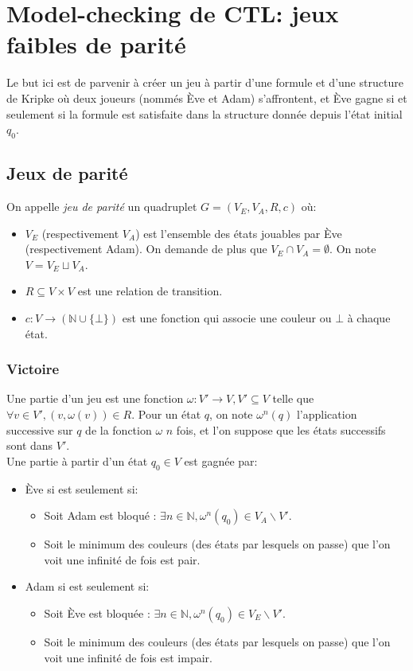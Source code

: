 \documentclass[10pt,a4paper]{article}
\begin{document}
\section{Model-checking de CTL: jeux faibles de parité}
Le but ici est de parvenir à créer un jeu à partir d'une formule et d'une structure de Kripke où deux joueurs (nommés Ève et Adam) s'affrontent, et Ève gagne si et seulement si la formule est satisfaite dans la structure donnée depuis l'état initial $q_0$.

\subsection{Jeux de parité}
On appelle \emph{jeu de parité} un quadruplet $G = (V_E, V_A, R, c)$ où:
\begin{itemize}
\item $V_E$ (respectivement $V_A$) est l'ensemble des états jouables par Ève (respectivement Adam). On demande de plus que $V_E \cap V_A = \emptyset$. On note $V = V_E \sqcup V_A$.
\item $R \subseteq V \times V$ est une relation de transition.
\item $c : V \to (\mathbb{N} \cup \{\bot\})$ est une fonction qui associe une couleur ou $\bot$ à chaque état.
\end{itemize}

\subsubsection{Victoire}
Une partie d'un jeu est une fonction $\omega : V' \to V, V' \subseteq V$ telle que $\forall v \in V', (v,\omega(v)) \in R$. Pour un état $q$, on note $\omega^n(q)$ l'application successive sur $q$ de la fonction $\omega$ $n$ fois, et l'on suppose que les états successifs sont dans $V'$.\\

Une partie à partir d'un état $q_0 \in V$ est gagnée par:
\begin{itemize}
\item Ève si est seulement si:
	\begin{itemize}
	\item Soit Adam est bloqué : $\exists n \in \mathbb{N}, \omega^n (q_0) \in V_A\backslash V'$.
	\item Soit le minimum des couleurs (des états par lesquels on passe) que l'on voit une infinité de fois est pair.
	\end{itemize}
\item Adam si est seulement si:
	\begin{itemize}
		\item Soit Ève est bloquée : $\exists n \in \mathbb{N}, \omega^n (q_0) \in V_E\backslash V'$.
		\item Soit le minimum des couleurs (des états par lesquels on passe) que l'on voit une infinité de fois est impair.
	\end{itemize}
\end{itemize}
\end{document}
